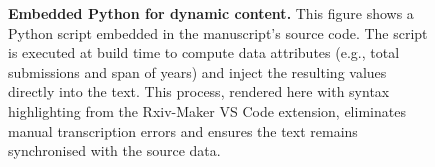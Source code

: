 \documentclass[times, twoside]{rxiv_maker_style}
\begin{document}
\begin{figure}[b]
\centering
{}
\begingroup\captionsetup{width=\linewidth,singlelinecheck=false,justification=justified}\setlength{\abovecaptionskip}{6pt}\setlength{\belowcaptionskip}{6pt}\ifdefined\justifying\justifying\fi\caption{\textbf{Embedded Python for dynamic content.} This figure shows a Python script embedded in the manuscript's source code. The script is executed at build time to compute data attributes (e.g., total submissions and span of years) and inject the resulting values directly into the text. This process, rendered here with syntax highlighting from the Rxiv-Maker VS Code extension, eliminates manual transcription errors and ensures the text remains synchronised with the source data.}\label{fig:python_snippet}\endgroup
\end{figure}
\end{document}

